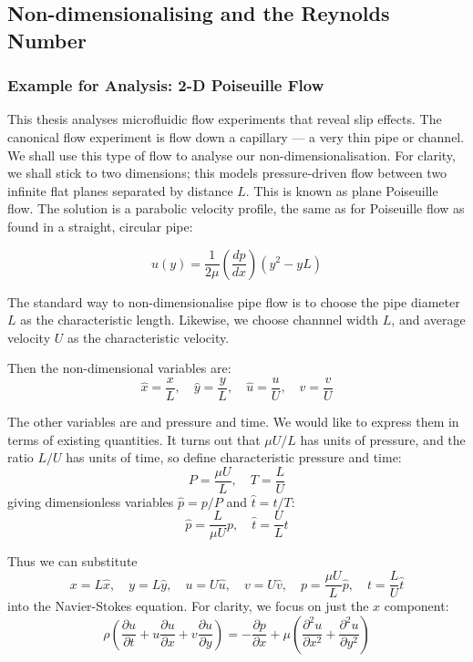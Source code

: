 \documentclass[12pt, a4paper, twoside, openright]{book}
\begin{document}
\clearpage
\subsection{Non-dimensionalising and the Reynolds Number}
\subsubsection{Example for Analysis: 2-D Poiseuille Flow}
This thesis analyses microfluidic flow experiments that reveal slip effects.  The canonical flow experiment is flow down a capillary --- a very thin pipe or channel.  
We shall use this type of flow to analyse our non-dimensionalisation.  For clarity, we shall stick to two dimensions; this models pressure-driven flow between two infinite flat planes separated by distance $L$.
This is known as plane Poiseuille flow.  The solution is a parabolic velocity profile, the same as for Poiseuille flow as found in a straight, circular pipe:

\begin{equation}
u(y) = \frac{1}{2 \mu} \left( \frac{dp}{dx} \right) \left( y^2 - yL \right)
\end{equation}

The standard way to non-dimensionalise pipe flow is to choose the pipe diameter $L$ as the characteristic length.  Likewise, we choose channnel width $L$, and average velocity $U$ as the characteristic velocity.


Then the non-dimensional variables are:
\begin{equation}
\hat{x} = \frac{x}{L}, \quad \hat{y} = \frac{y}{L}, \quad
 \hat{u} = \frac{u}{U}, \quad \hat{v} = \frac{v}{U}
\end{equation}

The other variables are and pressure and time.  We would like to express them in terms of existing quantities.
It turns out that $ \mu U / L $ has units of pressure, and the ratio $L /U$ has units of time, so define characteristic pressure and time:
\begin{equation}
P = \frac{\mu U}{L}, \quad T = \frac{L}{U}
\end{equation}
giving dimensionless variables $\hat{p} = p/P$ and $\hat{t}=t/T$:
\begin{equation}
\hat{p} = \frac{L}{\mu U} p, \quad \hat{t} = \frac{U}{L}t
\end{equation}

Thus we can substitute
\begin{equation}
x = L\hat{x}, \quad y = L\hat{y}, \quad u = U \hat{u}, \quad v = U \hat{v}, 
\quad p = \frac{\mu U}{L}\hat{p}, \quad t = \frac{L}{U}\hat{t}
\end{equation}
into the Navier-Stokes equation.  For clarity, we focus on just the $x$ component:
\begin{equation}
\rho \left( \frac{\partial u}{\partial t} +
 u \frac{\partial u}{\partial x} + v\frac{\partial u}{\partial y} \right) =
 - \frac{\partial p}{\partial x} + 
\mu \left( \frac{\partial^2 u}{\partial x^2} + \frac{\partial^2 u}{\partial y^2} \right)
\end{equation}
\end{document}
